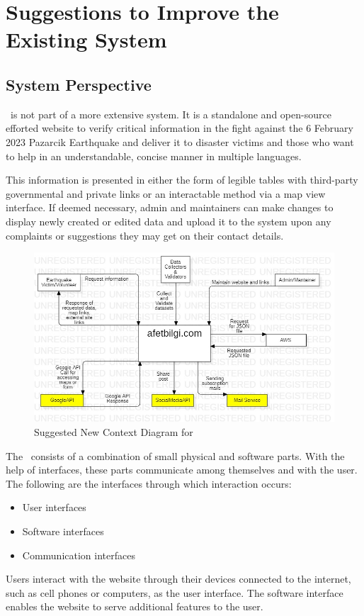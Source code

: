 \section{Suggestions to Improve the Existing System}

\subsection{System Perspective}

\afetbilgi\ is not part of a more extensive system. It is a standalone and open-source efforted website to verify critical information in the fight against the 6 February 2023 Pazarcik Earthquake and deliver it to disaster victims and those who want to help in an understandable, concise manner in multiple languages.

This information is presented in either the form of legible tables with third-party governmental and private links or an interactable method via a map view interface. If deemed necessary, admin and maintainers can make changes to display newly created or edited data and upload it to the system upon any complaints or suggestions they may get on their contact details.

\begin{figure}[H]
  \centering
  \includegraphics[width=\linewidth]{img/context-diagram-s4.jpg}
  \caption{Suggested New Context Diagram for \afetbilgi}
\end{figure}

\vfill
\newpage

The \afetbilgi\ consists of a combination of small physical and software parts. With the help of interfaces, these parts communicate among themselves and with the user. The following are the interfaces through which interaction occurs:
\begin{itemize}
  \setlength{\itemsep}{1pt}
  \item User interfaces
  \item Software interfaces
  \item Communication interfaces
\end{itemize}
Users interact with the website through their devices connected to the internet, such as cell phones or computers, as the user interface. The software interface enables the website to serve additional features to the user.

